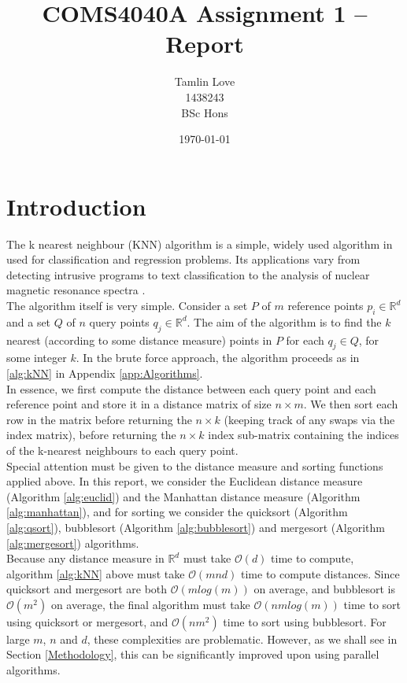 \documentclass[10pt]{article}
\begin{document}
\title{COMS4040A Assignment 1 -- Report}
\author{Tamlin Love\\1438243\\BSc Hons}
\date{\today} 

\maketitle 
\pagestyle{fancy}
\fancyhf{}
\fancyhead[R]{\thepage}
{} 
\section{Introduction}\label{Introduction}
The k nearest neighbour (KNN) algorithm is a simple, widely used algorithm in used for classification and regression problems\cite{altman92}. Its applications vary from detecting intrusive programs\cite{liao02} to text classification \cite{kwon03} to the analysis of nuclear magnetic resonance spectra \cite{kowalski72}.
\\
The algorithm itself is very simple. Consider a set $P$ of $m$ reference points $p_{i}\in\mathbb{R}^{d}$ and a set $Q$ of $n$ query points $q_{j} \in \mathbb{R}^{d}$. The aim of the algorithm is to find the $k$ nearest (according to some distance measure) points in $P$ for each $q_{j}\in Q$, for some integer $k$. In the brute force approach, the algorithm proceeds as in \ref{alg:kNN} in Appendix \ref{app:Algorithms}.
\\
In essence, we first compute the distance between each query point and each reference point and store it in a distance matrix of size $n \times m$. We then sort each row in the matrix before returning the $n \times k$ (keeping track of any swaps via the index matrix), before returning the $n \times k$ index sub-matrix containing the indices of the k-nearest neighbours to each query point.
\\
Special attention must be given to the distance measure and sorting functions applied above. In this report, we consider the Euclidean distance measure (Algorithm \ref{alg:euclid}) and the Manhattan distance measure (Algorithm \ref{alg:manhattan}), and for sorting we consider the quicksort (Algorithm \ref{alg:qsort}), bubblesort (Algorithm \ref{alg:bubblesort}) and mergesort (Algorithm \ref{alg:mergesort}) algorithms.
\\
Because any distance measure in $\mathbb{R}^{d}$ must take $\mathcal{O}(d)$ time to compute, algorithm \ref{alg:kNN} above must take $\mathcal{O}(mnd)$ time to compute distances. Since quicksort and mergesort are both $\mathcal{O}(mlog(m))$ on average, and bubblesort is $\mathcal{O}(m^2)$ on average, the final algorithm must take $\mathcal{O}(nmlog(m))$ time to sort using quicksort or mergesort, and $\mathcal{O}(nm^2)$ time to sort using bubblesort. For large $m$, $n$ and $d$, these complexities are problematic. However, as we shall see in Section \ref{Methodology}, this can be significantly improved upon using parallel algorithms.
\end{document}
